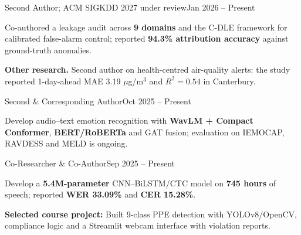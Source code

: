 \documentclass[11pt,a4paper]{article}
\begin{document}
{Second Author; ACM SIGKDD 2027 under review}{Jan 2026 -- Present}
\begin{highlights}
\item Co-authored a leakage audit across \textbf{9 domains} and the C-DLE framework for calibrated false-alarm control; reported \textbf{94.3\% attribution accuracy} against ground-truth anomalies.
\end{highlights}

\textbf{Other research.} Second author on health-centred air-quality alerts: the study reported 1-day-ahead MAE 3.19 $\mu$g/m$^3$ and $R^2=0.54$ in Canterbury.\par
{}
{Second \& Corresponding Author}{Oct 2025 -- Present}
\begin{highlights}
\item Develop audio--text emotion recognition with \textbf{WavLM + Compact Conformer}, \textbf{BERT/RoBERTa} and GAT fusion; evaluation on IEMOCAP, RAVDESS and MELD is ongoing.
\end{highlights}
{Co-Researcher \& Co-Author}{Sep 2025 -- Present}
\begin{highlights}
\item Develop a \textbf{5.4M-parameter} CNN--BiLSTM/CTC model on \textbf{745 hours} of speech; reported \textbf{WER 33.09\%} and \textbf{CER 15.28\%}.
\end{highlights}
\textbf{Selected course project:} Built 9-class PPE detection with YOLOv8/OpenCV, compliance logic and a Streamlit webcam interface with violation reports.
\end{document}
